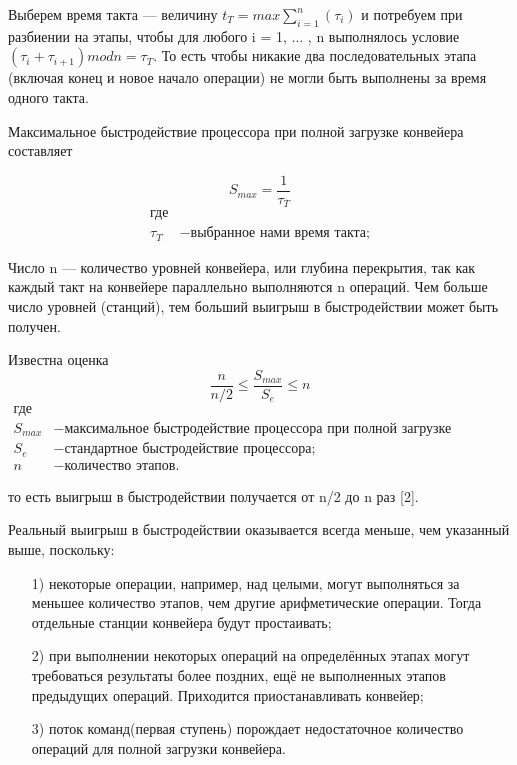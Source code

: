 \documentclass[a4paper,14pt]{report}
\begin{document}
Выберем время такта — величину $t _{T} = max{\sum\limits_{i=1}^n(\tau_{i})}$ и потребуем при разбиении на этапы, чтобы для любого i = 1, ... , n выполнялось условие $(\tau_{i} + \tau_{i+1}) mod n = \tau_{T}$. То есть чтобы никакие два последовательных этапа (включая конец и новое начало операции) не могли быть выполнены за время одного такта.

Максимальное быстродействие процессора при полной загрузке конвейера составляет

\begin{equation}\label{form:way}
 S_{max}={\frac{1}{\tau _{T}}}
 \end{equation}
 \begin{align*}
    \text{где} \\
    \tau _{T} &- \text{выбранное нами время такта;}
\end{align*}

Число n — количество уровней конвейера, или глубина перекрытия, так как каждый такт на конвейере параллельно выполняются n операций. Чем больше число уровней (станций), тем больший выигрыш в быстродействии может быть получен.

Известна оценка
\begin{equation}\label{form:way}
{\frac{n}{n/2} \leq {\frac{S_{max}}{S_{e}}} \leq n}
 \end{equation}
 \begin{align*}
    \text{где} \\
    S_{max} &- \text{максимальное быстродействие процессора  при полной загрузке конвейера;} \\
    S_{e} &- \text{стандартное быстродействие процессора;} \\
   n &- \text{количество этапов.}
\end{align*}

то есть выигрыш в быстродействии получается от n/2  до n раз [2].


Реальный выигрыш в быстродействии оказывается всегда меньше, чем указанный выше, поскольку:

\begin{enumerate}
\item[1)] некоторые операции, например, над целыми, могут выполняться за меньшее количество этапов, чем другие арифметические операции. Тогда отдельные станции конвейера будут простаивать;
\item[2)] при выполнении некоторых операций на определённых этапах могут требоваться результаты более поздних, ещё не выполненных этапов предыдущих операций. Приходится приостанавливать конвейер;
\item[3)] поток команд(первая ступень) порождает недостаточное количество операций для полной загрузки конвейера.
\end{enumerate}
\end{document}
